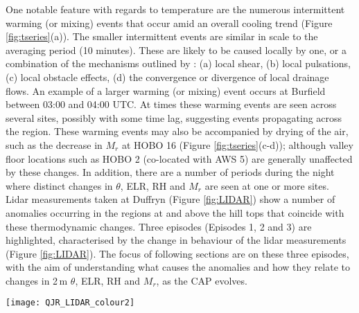 \documentclass[times]{qjrms4}
\begin{document}
One notable feature with regards to temperature are the numerous intermittent warming (or mixing) events that occur amid an overall cooling trend (Figure \ref{fig:tseries}(a)). The smaller intermittent events are similar in scale to the averaging period (10 minutes). These are likely to be caused locally by one, or a combination of the mechanisms outlined by \citet{banta2004nocturnal}: (a) local shear, (b) local pulsations, (c) local obstacle effects, (d) the convergence or divergence of local drainage flows. An example of a larger warming (or mixing) event occurs at Burfield between 03:00 and 04:00 UTC. At times these warming events are seen across several sites, possibly with some time lag, suggesting events propagating across the region. These warming events may also be accompanied by drying of the air, such as the decrease in $M_r$ at HOBO 16 (Figure \ref{fig:tseries}(c-d)); although valley floor locations such as HOBO 2 (co-located with AWS 5) are generally unaffected by these changes. In addition, there are a number of periods during the night where distinct changes in $\theta$, ELR, RH and $M_r$ are seen at one or more sites. Lidar measurements taken at Duffryn (Figure \ref{fig:LIDAR}) show a number of anomalies occurring in the regions at and above the hill tops that coincide with these thermodynamic changes. Three episodes (Episodes 1, 2 and 3) are highlighted, characterised by the change in behaviour of the lidar measurements (Figure \ref{fig:LIDAR}). The focus of following sections are on these three episodes, with the aim of understanding what causes the anomalies and how they relate to changes in 2$\,\mbox{m}$ $\theta$, ELR, RH and $M_r$, as the CAP evolves.
       \begin{figure*}
        \centering
        \texttt{[image: QJR\_LIDAR\_colour2]}
        \caption{Time series of NCAS lidar measurements taken at Duffryn showing vertical profiles of (a) vertical velocity and (b) backscatter. The vertical dashed lines indicate local sunrise. The horizontal dot-dashed line marks the mean hilltop height.}
	\label{fig:LIDAR}
        \end{figure*}

%
\end{document}
